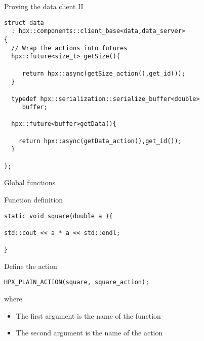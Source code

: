 \documentclass[12pt,t]{beamer}
\begin{document}
\begin{frame}[fragile]{Proving the data client II}

\begin{lstlisting}
struct data
  : hpx::components::client_base<data,data_server>
{
  // Wrap the actions into futures  
  hpx::future<size_t> getSize(){

     return hpx::async(getSize_action(),get_id());
  }
  
  typedef hpx::serialization::serialize_buffer<double> 
     buffer;
     
  hpx::future<buffer>getData(){

    return hpx::async(getData_action(),get_id());
  }
        
);
\end{lstlisting}

\end{frame}

\begin{frame}[fragile]{Global functions}

\begin{block}{Function definition}
\begin{lstlisting}
static void square(double a ){

std::cout << a * a << std::endl;

}
\end{lstlisting}
\end{block}

\begin{block}{Define the action}
\begin{lstlisting}
HPX_PLAIN_ACTION(square, square_action);
\end{lstlisting}
where
\begin{itemize}
\item The first argument is the name of the function
\item The second argument is the name of the action
\end{itemize}

\end{block}
\end{frame}
\end{document}
